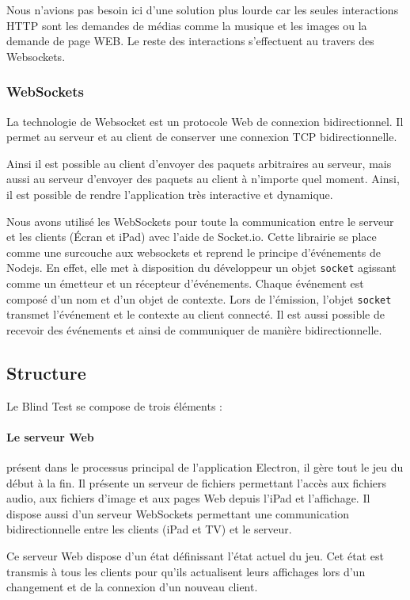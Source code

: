Nous n'avions pas besoin ici d'une solution plus lourde car les seules interactions HTTP sont les demandes de médias comme la musique et les images ou la demande de page WEB.
Le reste des interactions s'effectuent au travers des Websockets.

\subsubsection{WebSockets}

La technologie de Websocket est un protocole Web de connexion bidirectionnel.
Il permet au serveur et au client de conserver une connexion TCP bidirectionnelle.

Ainsi il est possible au client d'envoyer des paquets arbitraires au serveur, mais aussi au serveur d'envoyer des paquets au client à n'importe quel moment.
Ainsi, il est possible de rendre l'application très interactive et dynamique.

Nous avons utilisé les WebSockets pour toute la communication entre le serveur et les clients (Écran et iPad) avec l'aide de Socket.io.
Cette librairie se place comme une surcouche aux websockets et reprend le principe d'événements de Nodejs.
En effet, elle met à disposition du développeur un objet \texttt{socket} agissant comme un émetteur et un récepteur d'événements.
Chaque événement est composé d'un nom et d'un objet de contexte.
Lors de l'émission, l'objet \texttt{socket} transmet l'événement et le contexte au client connecté.
Il est aussi possible de recevoir des événements et ainsi de communiquer de manière bidirectionnelle.

\subsection{Structure}

Le Blind Test se compose de trois éléments :

\paragraph{Le serveur Web} présent dans le processus principal de l'application Electron, il gère tout le jeu du début à la fin.
Il présente un serveur de fichiers permettant l'accès aux fichiers audio, aux fichiers d'image et aux pages Web depuis l'iPad et l'affichage.
Il dispose aussi d'un serveur WebSockets permettant une communication bidirectionnelle entre les clients (iPad et TV) et le serveur.

Ce serveur Web dispose d'un état définissant l'état actuel du jeu.
Cet état est transmis à tous les clients pour qu'ils actualisent leurs affichages lors d'un changement et de la connexion d'un nouveau client.

